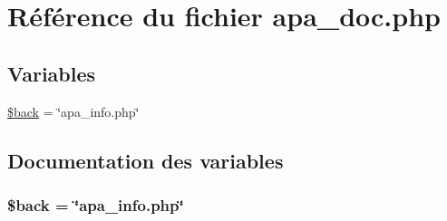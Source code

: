 \hypertarget{apa__doc_8php}{
\section{R\'{e}f\'{e}rence du fichier apa\_\-doc.php}
\label{apa__doc_8php}
}
\subsection*{Variables}
\begin{CompactItemize}
\item 
\hyperlink{apa__doc_8php_a0}{\$back} = \char`\"{}apa\_\-info.php\char`\"{}
\end{CompactItemize}


\subsection{Documentation des variables}
\hypertarget{apa__doc_8php_a0}{
\subsubsection[\$back]{\setlength{\rightskip}{0pt plus 5cm}\$back = \char`\"{}apa\_\-info.php\char`\"{}}}
\label{apa__doc_8php_a0}


